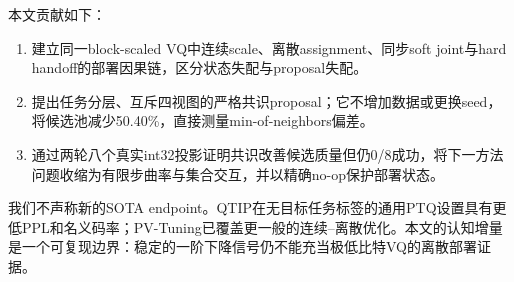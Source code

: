 本文贡献如下：
\begin{enumerate}
  \item 建立同一block-scaled VQ中连续scale、离散assignment、同步soft joint与hard handoff的部署因果链，区分状态失配与proposal失配。
  \item 提出任务分层、互斥四视图的严格共识proposal；它不增加数据或更换seed，将候选池减少50.40\%，直接测量min-of-neighbors偏差。
  \item 通过两轮八个真实int32投影证明共识改善候选质量但仍0/8成功，将下一方法问题收缩为有限步曲率与集合交互，并以精确no-op保护部署状态。
\end{enumerate}

我们不声称新的SOTA endpoint。QTIP在无目标任务标签的通用PTQ设置具有更低PPL和名义码率；PV-Tuning已覆盖更一般的连续--离散优化\cite{pvtuning}。本文的认知增量是一个可复现边界：稳定的一阶下降信号仍不能充当极低比特VQ的离散部署证据。
